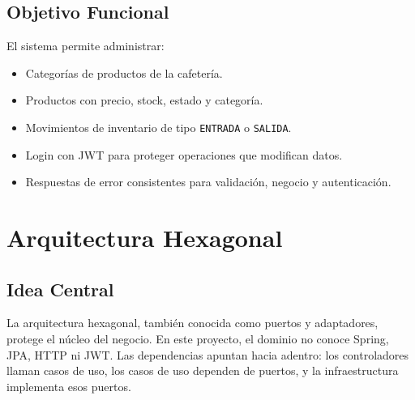 \documentclass[11pt,oneside]{report}
\begin{document}
\section{Objetivo Funcional}

El sistema permite administrar:

\begin{itemize}
  \item Categorías de productos de la cafetería.
  \item Productos con precio, stock, estado y categoría.
  \item Movimientos de inventario de tipo \texttt{ENTRADA} o \texttt{SALIDA}.
  \item Login con JWT para proteger operaciones que modifican datos.
  \item Respuestas de error consistentes para validación, negocio y autenticación.
\end{itemize}

\chapter{Arquitectura Hexagonal}

\section{Idea Central}

La arquitectura hexagonal, también conocida como puertos y adaptadores, protege el núcleo del negocio. En este proyecto, el dominio no conoce Spring, JPA, HTTP ni JWT. Las dependencias apuntan hacia adentro: los controladores llaman casos de uso, los casos de uso dependen de puertos, y la infraestructura implementa esos puertos.
\end{document}
